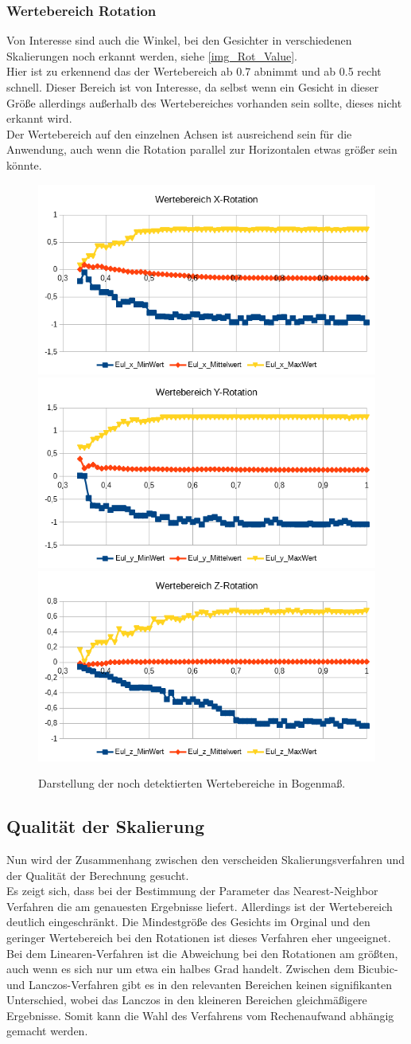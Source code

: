 \subsubsection{Wertebereich Rotation}
Von Interesse sind auch die Winkel, bei den Gesichter in verschiedenen Skalierungen noch erkannt werden, siehe \autoref{img_Rot_Value}.\\
Hier ist zu erkennend das der Wertebereich ab 0.7 abnimmt und ab 0.5 recht schnell. Dieser Bereich ist von Interesse, da selbst wenn ein Gesicht in dieser Größe allerdings außerhalb des Wertebereiches vorhanden sein sollte, dieses nicht erkannt wird.\\
Der Wertebereich auf den einzelnen Achsen ist ausreichend sein für die Anwendung, auch wenn die Rotation parallel zur Horizontalen etwas größer sein könnte.
\begin{figure}
	\centering
	\includegraphics[width=0.3\linewidth]{tabelle/X_Rot}
	\includegraphics[width=0.3\linewidth]{tabelle/Y_Rot}
	\includegraphics[width=0.3\linewidth]{tabelle/Z_Rot}
	\caption{Darstellung der noch detektierten Wertebereiche in Bogenmaß.}
	\label{img_Rot_Value}
\end{figure}
\subsection{Qualität der Skalierung}
Nun wird der Zusammenhang zwischen den verscheiden Skalierungsverfahren und der Qualität der Berechnung gesucht.\\
Es zeigt sich, dass bei der Bestimmung der Parameter das Nearest-Neighbor Verfahren die am genauesten Ergebnisse liefert. Allerdings ist der Wertebereich deutlich eingeschränkt. Die Mindestgröße des Gesichts im Orginal und den geringer Wertebereich bei den Rotationen ist dieses Verfahren eher ungeeignet.\\
Bei dem Linearen-Verfahren ist die Abweichung bei den Rotationen am größten, auch wenn es sich nur um etwa ein halbes Grad handelt. Zwischen dem Bicubic- und Lanczos-Verfahren gibt es in den relevanten Bereichen keinen signifikanten Unterschied, wobei das Lanczos in den kleineren Bereichen gleichmäßigere Ergebnisse. Somit kann die Wahl des Verfahrens vom Rechenaufwand abhängig gemacht werden. 
